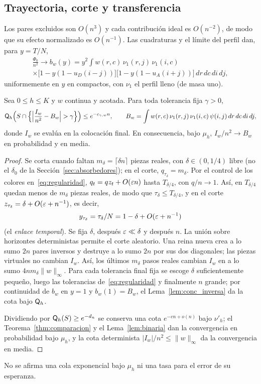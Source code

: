 \subsection{Trayectoria, corte y transferencia}

Los pares excluidos son $O(n^3)$ y cada contribución ideal es $O(n^{-2})$, de modo que su efecto
normalizado es $O(n^{-1})$. Las cuadraturas y el límite del perfil dan, para $y=T/N$,
\begin{multline*}
 \frac{\Phi_0}{n^2}\longrightarrow b_w(y)=y^2\int w(r,c)\,\nu_1(r,j)\,\nu_1(i,c)\\
 \times\bigl[1-y(1-u_{D}(i-j))\bigr]\bigl[1-y(1-u_{A}(i+j))\bigr]\,dr\,dc\,di\,dj ,
\end{multline*}
uniformemente en $y$ en compactos, con $\nu_1$ el perfil lleno (de masa uno).

\begin{proposicion}\label{prop:inversa}
Sea $0\le h\le K$ y $w$ continua y acotada. Para toda tolerancia fija $\gamma>0$,
\[
 \QQ_h\Bigl(S\cap\Bigl\{\Bigl|\frac{I_w}{n^2}-B_w\Bigr|>\gamma\Bigr\}\Bigr)\le e^{-c_{\gamma,w}n},
 \qquad B_w=\int w(r,c)\,\nu_1(r,j)\,\nu_1(i,c)\,\psi(i,j)\,dr\,dc\,di\,dj,
\]
donde $I_w$ se evalúa en la colocación final. En consecuencia, bajo $\mu_h$,
$I_w/n^2\to B_w$ en probabilidad y en media.
\end{proposicion}

\begin{proof}
Se corta cuando faltan $m_\delta=\lceil\delta n\rceil$ piezas reales, con $\delta\in(0,1/4)$ libre
(no el $\delta_0$ de la Sección~\ref{sec:absorbedores}); en el corte, $q_{\tau_\delta}=m_\delta$.
Por el control de los colores en~\eqref{eq:regularidad}, $q_t=qz_t+O(\varepsilon n)$ hasta
$T_{\delta/4}$, con $q/n\to1$. Así, en $T_{\delta/4}$ quedan menos de $m_\delta$ piezas reales, de
modo que $\tau_\delta\le T_{\delta/4}$, y en el corte $z_{\tau_\delta}=\delta+O(\varepsilon+n^{-1})$, es
decir,
\[
 y_{\tau_\delta}=\tau_\delta/N=1-\delta+O(\varepsilon+n^{-1})
\]
(el \emph{enlace temporal}). Se fija $\delta$, después $\varepsilon\ll\delta$ y después $n$. La unión sobre
horizontes deterministas permite el corte aleatorio. Una reina nueva crea a
lo sumo $2n$ pares inversos y destruye a lo sumo $2n$ por sus dos diagonales; las piezas
virtuales no cambian $I_w$. Así, los últimos $m_\delta$ pasos reales cambian $I_w$ en a lo sumo
$4nm_\delta\|w\|_\infty$. Para cada tolerancia final fija se escoge $\delta$ suficientemente
pequeño, luego las tolerancias de~\eqref{eq:regularidad} y finalmente $n$ grande; por continuidad de
$b_w$ en $y=1$ y $b_w(1)=B_w$, el Lema~\ref{lem:conc_inversa} da la cota bajo $\mathsf{Q}_h$.

Dividiendo por $\mathsf{Q}_h(S)\ge e^{-d_n}$ se conserva una cota $e^{-cn+o(n)}$ bajo $\nu'_h$; el
Teorema~\ref{thm:comparacion} y el Lema~\ref{lem:binaria} dan la convergencia en probabilidad bajo
$\mu_h$, y la cota determinista $|I_w|/n^2\le\|w\|_\infty$ da la convergencia en media.
\end{proof}

No se afirma una cola exponencial bajo $\mu_h$ ni una tasa para el error de su esperanza.
